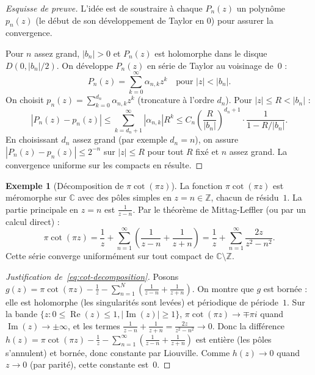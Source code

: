 \documentclass[12pt,a4paper,openany]{book}
\theoremstyle{definition}
\newtheorem{exemple}[definition]{Exemple}
\theoremstyle{plain}
\theoremstyle{remark}
\newcommand{\C}{\mathbb{C}}
\newcommand{\Z}{\mathbb{Z}}
\DeclareMathOperator{\re}{Re}
\DeclareMathOperator{\im}{Im}
\newcommand{\abs}[1]{\left|#1\right|}
\begin{document}
\begin{proof}[Esquisse de preuve]
L'idée est de soustraire à chaque $P_n(z)$ un polynôme $p_n(z)$ (le début
de son développement de Taylor en $0$) pour assurer la convergence.

Pour $n$ assez grand, $\abs{b_n} > 0$ et $P_n(z)$ est holomorphe dans le disque
$D(0, \abs{b_n}/2)$. On développe $P_n(z)$ en série de Taylor au voisinage
de~$0$ :
\[
  P_n(z) = \sum_{k=0}^{\infty} \alpha_{n,k} z^k \quad
  \text{pour } \abs{z} < \abs{b_n}.
\]
On choisit $p_n(z) = \sum_{k=0}^{d_n} \alpha_{n,k} z^k$ (troncature à
l'ordre $d_n$). Pour $\abs{z} \leq R < \abs{b_n}$ :
\[
  \abs{P_n(z) - p_n(z)} \leq \sum_{k=d_n+1}^{\infty} \abs{\alpha_{n,k}} R^k
  \leq C_n \left(\frac{R}{\abs{b_n}}\right)^{d_n+1} \cdot \frac{1}{1 - R/\abs{b_n}}.
\]
En choisissant $d_n$ assez grand (par exemple $d_n = n$), on assure
$\abs{P_n(z) - p_n(z)} \leq 2^{-n}$ sur $\abs{z} \leq R$ pour tout $R$ fixé
et $n$ assez grand. La convergence uniforme sur les compacts en résulte.
\end{proof}

\begin{exemple}[Décomposition de $\pi\cot(\pi z)$]\label{ex:cot-mittag-leffler}
La fonction $\pi\cot(\pi z)$ est méromorphe sur $\C$ avec des pôles simples
en $z = n \in \Z$, chacun de résidu~$1$. La partie principale en $z = n$ est
$\frac{1}{z - n}$. Par le théorème de Mittag-Leffler (ou par un calcul direct) :
\begin{equation}\label{eq:cot-decomposition}
  \pi \cot(\pi z) = \frac{1}{z} + \sum_{n=1}^{\infty}
  \left(\frac{1}{z - n} + \frac{1}{z + n}\right)
  = \frac{1}{z} + \sum_{n=1}^{\infty} \frac{2z}{z^2 - n^2}.
\end{equation}
Cette série converge uniformément sur tout compact de $\C \setminus \Z$.
\end{exemple}

\begin{proof}[Justification de~\eqref{eq:cot-decomposition}]
Posons $g(z) = \pi\cot(\pi z) - \frac{1}{z} - \sum_{n=1}^{N}
\left(\frac{1}{z-n} + \frac{1}{z+n}\right)$. On montre que $g$ est bornée :
elle est holomorphe (les singularités sont levées) et périodique de période~$1$.
Sur la bande $\{z : 0 \leq \re(z) \leq 1, \abs{\im(z)} \geq 1\}$,
$\pi\cot(\pi z) \to \mp \pi i$ quand $\im(z) \to \pm\infty$, et les termes
$\frac{1}{z-n} + \frac{1}{z+n} = \frac{2z}{z^2-n^2} \to 0$. Donc la
différence $h(z) = \pi\cot(\pi z) - \frac{1}{z} - \sum_{n=1}^{\infty}
(\frac{1}{z-n} + \frac{1}{z+n})$ est entière (les pôles s'annulent) et
bornée, donc constante par Liouville. Comme $h(z) \to 0$ quand $z \to 0$
(par parité), cette constante est~$0$.
\end{proof}
\end{document}
